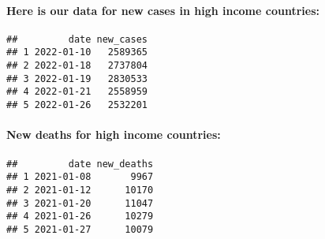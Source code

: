 \documentclass[
]{article}
\newenvironment{Shaded}{\begin{snugshade}}{\end{snugshade}}
\newcommand{\DecValTok}[1]{\textcolor[rgb]{0.00,0.00,0.81}{#1}}
\newcommand{\FunctionTok}[1]{\textcolor[rgb]{0.00,0.00,0.00}{#1}}
\newcommand{\NormalTok}[1]{#1}
\newcommand{\OtherTok}[1]{\textcolor[rgb]{0.56,0.35,0.01}{#1}}
\newcommand{\SpecialCharTok}[1]{\textcolor[rgb]{0.00,0.00,0.00}{#1}}
\newcommand{\StringTok}[1]{\textcolor[rgb]{0.31,0.60,0.02}{#1}}
\begin{document}
\begin{Shaded}
\end{Shaded}

\hypertarget{here-is-our-data-for-new-cases-in-high-income-countries}{%
\paragraph{Here is our data for new cases in high income
countries:}\label{here-is-our-data-for-new-cases-in-high-income-countries}}

\begin{verbatim}
##         date new_cases
## 1 2022-01-10   2589365
## 2 2022-01-18   2737804
## 3 2022-01-19   2830533
## 4 2022-01-21   2558959
## 5 2022-01-26   2532201
\end{verbatim}

\begin{Shaded}
\end{Shaded}

\hypertarget{new-deaths-for-high-income-countries}{%
\paragraph{New deaths for high income
countries:}\label{new-deaths-for-high-income-countries}}

\begin{verbatim}
##         date new_deaths
## 1 2021-01-08       9967
## 2 2021-01-12      10170
## 3 2021-01-20      11047
## 4 2021-01-26      10279
## 5 2021-01-27      10079
\end{verbatim}
\end{document}
